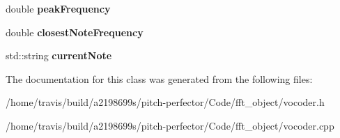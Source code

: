 \begin{DoxyCompactItemize}
\item 
\hypertarget{classVocoder_abae7bb20fa180d030d6a96f08af48429}{double {\bfseries peak\-Frequency}}\label{classVocoder_abae7bb20fa180d030d6a96f08af48429}

\item 
\hypertarget{classVocoder_a6550fbf8de5847c7d5a6fcb90b4f3c2b}{double {\bfseries closest\-Note\-Frequency}}\label{classVocoder_a6550fbf8de5847c7d5a6fcb90b4f3c2b}

\item 
\hypertarget{classVocoder_aa68df7f44a93027e6469e7b319ce9ce5}{std\-::string {\bfseries current\-Note}}\label{classVocoder_aa68df7f44a93027e6469e7b319ce9ce5}

\end{DoxyCompactItemize}


The documentation for this class was generated from the following files\-:\begin{DoxyCompactItemize}
\item 
/home/travis/build/a2198699s/pitch-\/perfector/\-Code/fft\-\_\-object/vocoder.\-h\item 
/home/travis/build/a2198699s/pitch-\/perfector/\-Code/fft\-\_\-object/vocoder.\-cpp\end{DoxyCompactItemize}
